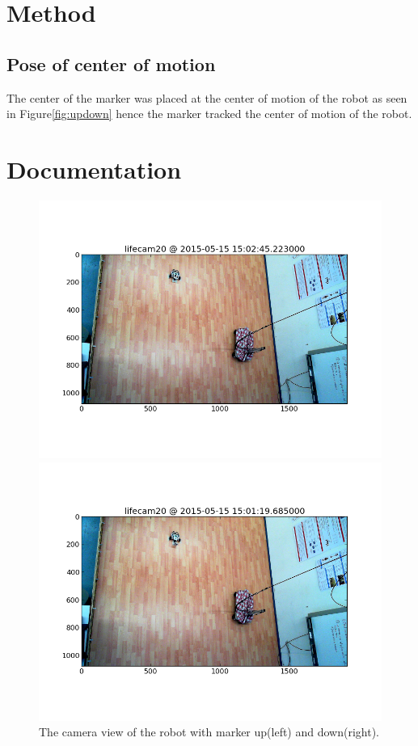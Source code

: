 \documentclass{scrartcl}
\begin{document}
\section{Method}
\subsection{Pose of center of motion}
The center of the marker was placed at the center of motion of the robot as seen in Figure\ref{fig:updown} hence the marker tracked the center of motion of the robot.

\section{Documentation}

\begin{figure}[H]
\centering
\begin{minipage}{.5\textwidth}
  \centering
  \includegraphics[width=.8\linewidth]{img/marker_up.png}
\end{minipage}%
\begin{minipage}{.5\textwidth}
  \centering
  \includegraphics[width=.8\linewidth]{img/marker_down.png}
\end{minipage}
\caption{The camera view of the robot with marker up(left) and down(right).}
\label{fig:camera}
\end{figure}
\end{document}
